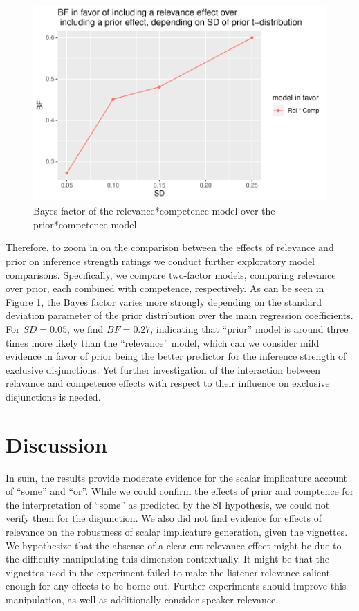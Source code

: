 \documentclass{sp}
\begin{document}
\begin{figure}[h]
	\begin{center}
		\includegraphics[width=0.8\linewidth]{images/BF_vs_SD_rel-comp_pri-comp.pdf}
	\end{center}
	\vspace{-0.3cm}
	\caption{Bayes factor of the relevance*competence model over the prior*competence model.}
	\label{bf-rel-pri}
\end{figure}

Therefore, to zoom in on the comparison between the effects of relevance and prior on inference strength ratings we conduct further exploratory model comparisons. Specifically, we compare two-factor models, comparing relevance over prior, each combined with competence, respectively. As can be seen in Figure \ref{bf-rel-pri}, the Bayes factor varies more strongly depending on the standard deviation parameter of the prior distribution over the main regression coefficients. For $SD=0.05$, we find $BF=0.27$, indicating that ``prior'' model is around three times more likely than the ``relevance'' model, which can we consider mild evidence in favor of prior being the better predictor for the inference strength of exclusive disjunctions. 
Yet further investigation of the interaction between relavance and competence effects with respect to their influence on exclusive disjunctions is needed.
 
\section{Discussion}
In sum, the results provide moderate evidence for the scalar implicature account of ``some'' and ``or''. While we could confirm the effects of prior and comptence for the interpretation of ``some'' as predicted by the SI hypothesis, we could not verify them for the disjunction. We also did not find evidence for effects of relevance on the robustness of scalar implicature generation, given the vignettes. We hypothesize that the absense of a clear-cut relevance effect might be due to the difficulty manipulating this dimension contextually. It might be that the vignettes used in the experiment failed to make the listener relevance salient enough for any effects to be borne out. Further experiments should improve this manipulation, as well as additionally consider speaker relevance.
\end{document}
